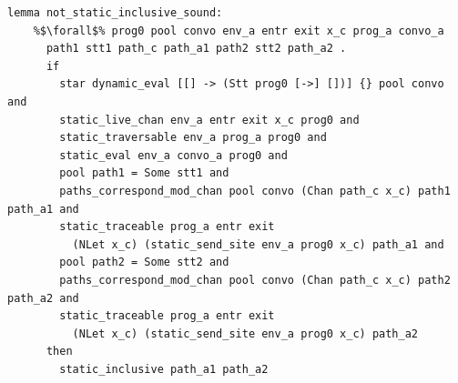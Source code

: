 \documentclass{article}
\begin{document}
\begin{lstlisting}[language=logic, escapechar=\%]
  lemma not_static_inclusive_sound:
    %$\forall$% prog0 pool convo env_a entr exit x_c prog_a convo_a
      path1 stt1 path_c path_a1 path2 stt2 path_a2 .
      if
        star dynamic_eval [[] -> (Stt prog0 [->] [])] {} pool convo and 
        static_live_chan env_a entr exit x_c prog0 and 
        static_traversable env_a prog_a prog0 and 
        static_eval env_a convo_a prog0 and 
        pool path1 = Some stt1 and 
        paths_correspond_mod_chan pool convo (Chan path_c x_c) path1 path_a1 and 
        static_traceable prog_a entr exit
          (NLet x_c) (static_send_site env_a prog0 x_c) path_a1 and 
        pool path2 = Some stt2 and 
        paths_correspond_mod_chan pool convo (Chan path_c x_c) path2 path_a2 and 
        static_traceable prog_a entr exit
          (NLet x_c) (static_send_site env_a prog0 x_c) path_a2
      then
        static_inclusive path_a1 path_a2
  \end{lstlisting}

  
\end{document}

